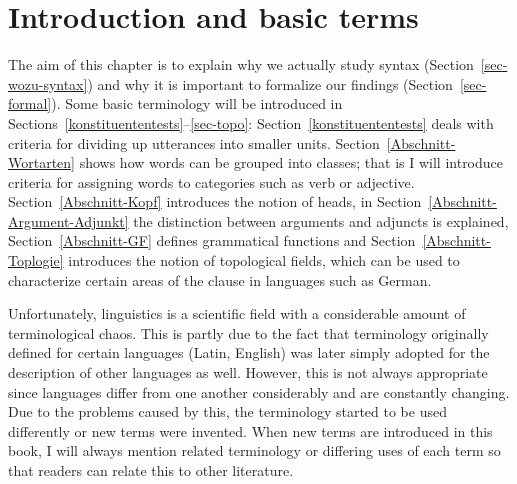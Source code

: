 
\chapter{Introduction and basic terms}
\label{Kapitel-Grundbegriffe}\label{chap-boxes}

The aim of this chapter is to explain why we actually study syntax
(Section~\ref{sec-wozu-syntax}) and why it is important to formalize our findings
(Section~\ref{sec-formal}). Some basic terminology will be introduced in
Sections~\ref{konstituententests}--\ref{sec-topo}: Section~\ref{konstituententests}
deals with criteria for dividing up utterances into smaller units. Section~\ref{Abschnitt-Wortarten} 
shows how words can be grouped into classes; that is I will introduce criteria for assigning words to
categories such as verb or adjective. Section~\ref{Abschnitt-Kopf} introduces the notion of 
heads, in
Section~\ref{Abschnitt-Argument-Adjunkt} the distinction between arguments and adjuncts is explained,
Section~\ref{Abschnitt-GF} defines grammatical functions and
Section~\ref{Abschnitt-Toplogie} introduces the notion of topological fields, which can be used to
characterize certain areas of the clause in languages such as German. 

Unfortunately, linguistics is a scientific field 
with a considerable amount of terminological chaos.
This is partly due to the fact that terminology originally defined for certain languages 
(\eg Latin, English)
was later simply adopted for the description of other languages as well. However, this is not always
appropriate since languages differ from one another considerably and are constantly changing.  
Due to the problems caused by this, the terminology started to be used differently or new terms were invented. 
When new terms are introduced in this book, I will always mention related terminology or differing uses of
each term so that readers can relate this to other literature.  



